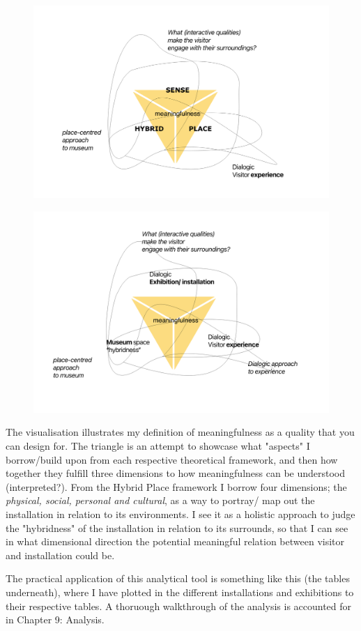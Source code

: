 \begin{figure}[h]
\centering 
\includegraphics[width=13cm]{pictures/Theory/early_iteration_framework.png}
\caption{}
\end{figure}

\begin{figure}[h]
\centering 
\includegraphics[width=13cm]{pictures/Theory/meaningfulness_triangle.png}
\caption{}
\end{figure}

The visualisation illustrates my definition of meaningfulness as a quality that you can design for. The triangle is an attempt to showcase what "aspects" I borrow/build upon from each respective theoretical framework, and then how together they fulfill three dimensions to how meaningfulness can be understood (interpreted?).
From the Hybrid Place framework I borrow four dimensions; the \emph{physical, social, personal and cultural}, as a way to portray/ map out the installation in relation to its environments. I see it as a holistic approach to judge the "hybridness" of the installation in relation to its surrounds, so that I can see in what dimensional direction the potential meaningful relation between visitor and installation could be.

The practical application of this analytical tool is something like this (the tables underneath), where I have plotted in the different installations and exhibitions to their respective tables. A thoruough walkthrough of the analysis is accounted for in Chapter 9: Analysis.
